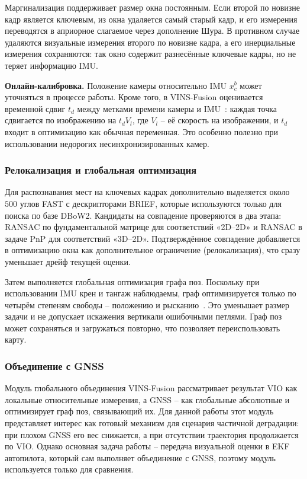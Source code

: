     Маргинализация поддерживает размер окна постоянным.
    Если второй по новизне кадр является ключевым, из окна удаляется самый старый кадр, и его измерения переводятся в априорное слагаемое через дополнение Шура.
    В противном случае удаляются визуальные измерения второго по новизне кадра, а его инерциальные измерения сохраняются: так окно содержит разнесённые ключевые кадры, но не теряет информацию IMU.

    \textbf{Онлайн-калибровка.}
    Положение камеры относительно IMU $x_c^b$ может уточняться в процессе работы.
    Кроме того, в VINS-Fusion оценивается временной сдвиг $t_d$ между метками времени камеры и IMU~\cite{vins_td}: каждая точка сдвигается по изображению на $t_d V_l$, где $V_l$ -- её скорость на изображении, и $t_d$ входит в оптимизацию как обычная переменная.
    Это особенно полезно при использовании недорогих несинхронизированных камер.

    \subsubsection{Релокализация и глобальная оптимизация}
    Для распознавания мест на ключевых кадрах дополнительно выделяется около $500$ углов FAST с дескрипторами BRIEF, которые используются только для поиска по базе DBoW2.
    Кандидаты на совпадение проверяются в два этапа: RANSAC по фундаментальной матрице для соответствий «2D--2D» и RANSAC в задаче PnP для соответствий «3D--2D».
    Подтверждённое совпадение добавляется в оптимизацию окна как дополнительное ограничение (релокализация), что сразу уменьшает дрейф текущей оценки.

    Затем выполняется глобальная оптимизация графа поз.
    Поскольку при использовании IMU крен и тангаж наблюдаемы, граф оптимизируется только по четырём степеням свободы -- положению и рысканию~\cite{vins_mono}.
    Это уменьшает размер задачи и не допускает искажения вертикали ошибочными петлями.
    Граф поз может сохраняться и загружаться повторно, что позволяет переиспользовать карту.

    \subsubsection{Объединение с GNSS}
    Модуль глобального объединения VINS-Fusion рассматривает результат VIO как локальные относительные измерения, а GNSS -- как глобальные абсолютные и оптимизирует граф поз, связывающий их.
    Для данной работы этот модуль представляет интерес как готовый механизм для сценария частичной деградации: при плохом GNSS его вес снижается, а при отсутствии траектория продолжается по VIO.
    Однако основная задача работы -- передача визуальной оценки в EKF автопилота, который сам выполняет объединение с GNSS, поэтому модуль используется только для сравнения.

